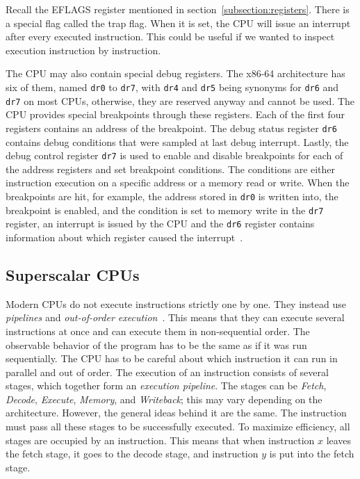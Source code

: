 Recall the EFLAGS register mentioned in section~\ref{subsection:registers}.
There is a special flag called the trap flag. When it is set, the CPU will
issue an interrupt after every executed instruction. This could be useful if we
wanted to inspect execution instruction by instruction.

The CPU may also contain special debug registers. The x86-64 architecture has
six of them, named \texttt{dr0} to \texttt{dr7}, with \texttt{dr4} and
\texttt{dr5} being synonyms for \texttt{dr6} and \texttt{dr7} on most CPUs,
otherwise, they are reserved anyway and cannot be used. The CPU provides
special breakpoints through these registers. Each of the first four registers
contains an address of the breakpoint. The debug status register \texttt{dr6}
contains debug conditions that were sampled at last debug interrupt. Lastly,
the debug control register \texttt{dr7} is used to enable and disable
breakpoints for each of the address registers and set breakpoint conditions.
The conditions are either instruction execution on a specific address or a
memory read or write. When the breakpoints are hit, for example, the address
stored in \texttt{dr0} is written into, the breakpoint is enabled, and the
condition is set to memory write in the \texttt{dr7} register, an interrupt is
issued by the CPU and the \texttt{dr6} register contains information about
which register caused the interrupt~\cite{intel-manual}.

\subsection{Superscalar CPUs}\label{section:superscalar-cpu}
Modern CPUs do not execute instructions strictly one by one. They instead use
\textit{pipelines} and \textit{out-of-order execution}~\cite{isa,
computer-architecture}. This means that they can execute several instructions
at once and can execute them in non-sequential order. The observable behavior
of the program has to be the same as if it was run sequentially. The CPU has to
be careful about which instruction it can run in parallel and out of order. The
execution of an instruction consists of several stages, which together form an
\textit{execution pipeline}. The stages can be \textit{Fetch}, \textit{Decode},
\textit{Execute}, \textit{Memory}, and \textit{Writeback}; this may vary
depending on the architecture. However, the general ideas behind it are the
same. The instruction must pass all these stages to be successfully executed.
To maximize efficiency, all stages are occupied by an instruction. This means
that when instruction $x$ leaves the fetch stage, it goes to the decode stage,
and instruction $y$ is put into the fetch stage.

